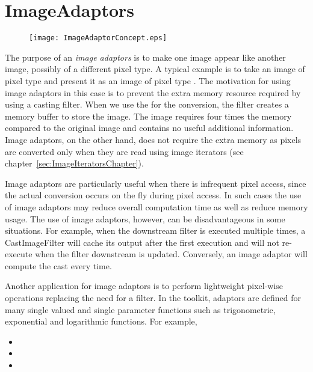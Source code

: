 
\chapter{ImageAdaptors}
\label{sec:ImageAdaptors}


\begin{figure}
\center
\texttt{[image: ImageAdaptorConcept.eps]}
\label{fig:ImageAdaptorConcept}
\end{figure}

The purpose of an \emph{image adaptors} is to make one image appear
like another image, possibly of a different pixel type.  A typical
example is to take an image of pixel type  and
present it as an image of pixel type . The motivation for
using image adaptors in this case is to prevent the extra memory
resource required by using a casting filter.  When we use the
 for the conversion, the filter creates a
memory buffer to store the  image. The  image
requires four times the memory compared to the original image and
contains no useful additional information. Image adaptors, on
the other hand, does not require the extra memory as pixels are
converted only when they are read using image iterators 
(see chapter~\ref{sec:ImageIteratorsChapter}).

Image adaptors are particularly useful when there is infrequent pixel
access, since the actual conversion occurs on the fly during pixel
access. In such cases the use of image adaptors may reduce overall
computation time as well as reduce memory usage. The use of image
adaptors, however, can be disadvantageous in some situations. For
example, when the downstream filter is executed multiple times, a
CastImageFilter will cache its output after the first execution and
will not re-execute when the filter downstream is updated. Conversely,
an image adaptor will compute the cast every time.

Another application for image adaptors is to perform lightweight
pixel-wise operations replacing the need for a filter. In the toolkit,
adaptors are defined for many single valued and single parameter
functions such as trigonometric, exponential and logarithmic
functions. For example,
\begin{itemize}
\item {}
\item {}
\item {}
\end{itemize}

